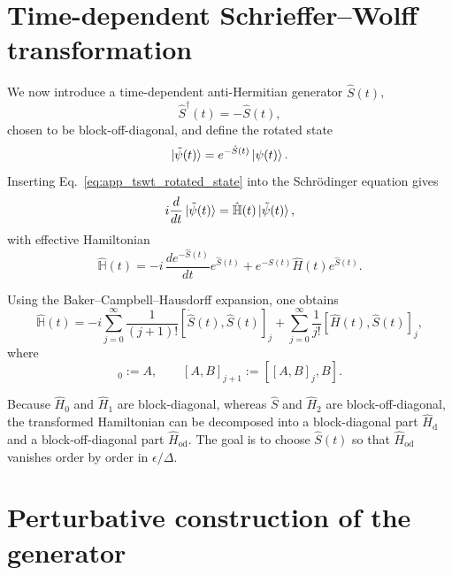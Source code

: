 \section{Time-dependent Schrieffer--Wolff transformation}
\label{app:tswt_transformation}

We now introduce a time-dependent anti-Hermitian generator \(\hat{S}(t)\),
\begin{equation}
\hat{S}^{\dagger}(t)=-\hat{S}(t),
\label{eq:app_tswt_antihermitian}
\end{equation}
chosen to be block-off-diagonal, and define the rotated state
\begin{equation}
\ket{\tilde{\psi}(t)}
=
e^{-\hat{S}(t)}\ket{\psi(t)}.
\label{eq:app_tswt_rotated_state}
\end{equation}
Inserting Eq.~\eqref{eq:app_tswt_rotated_state} into the Schr\"odinger equation gives
\begin{equation}
i\frac{d}{dt}\ket{\tilde{\psi}(t)}
=
\hat{\mathbb{H}}(t)\ket{\tilde{\psi}(t)},
\label{eq:app_tswt_effective_schrodinger}
\end{equation}
with effective Hamiltonian
\begin{equation}
\hat{\mathbb{H}}(t)
=
-i\,
\frac{d e^{-\hat{S}(t)}}{dt}e^{\hat{S}(t)}
+
e^{-\hat{S}(t)}\hat{H}(t)e^{\hat{S}(t)}.
\label{eq:app_tswt_effective_hamiltonian_exact}
\end{equation}

Using the Baker--Campbell--Hausdorff expansion, one obtains
\begin{equation}
\hat{\mathbb{H}}(t)
=
-i\sum_{j=0}^{\infty}\frac{1}{(j+1)!}
[\dot{\hat{S}}(t),\hat{S}(t)]_{j}
+
\sum_{j=0}^{\infty}\frac{1}{j!}
[\hat{H}(t),\hat{S}(t)]_{j},
\label{eq:app_tswt_bch_expansion}
\end{equation}
where
\begin{equation}
[A,B]_0:=A,
\qquad
[A,B]_{j+1}:=[[A,B]_j,B].
\label{eq:app_tswt_nested_commutator}
\end{equation}

Because \(\hat{H}_0\) and \(\hat{H}_1\) are block-diagonal, whereas \(\hat{S}\) and \(\hat{H}_2\) are block-off-diagonal, the transformed Hamiltonian can be decomposed into a block-diagonal part \(\hat{H}_{\mathrm d}\) and a block-off-diagonal part \(\hat{H}_{\mathrm{od}}\). The goal is to choose \(\hat{S}(t)\) so that \(\hat{H}_{\mathrm{od}}\) vanishes order by order in \(\epsilon/\Delta\).

\section{Perturbative construction of the generator}
\label{app:tswt_generator_construction}

